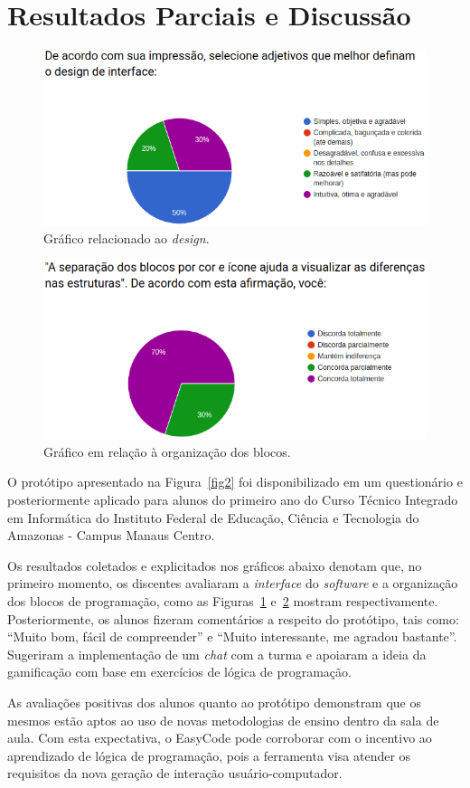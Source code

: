 \documentclass[12pt]{article}
\begin{document}
\section{Resultados Parciais e Discussão}
	\begin{figure}[!htbp]
		\centering
		\includegraphics[scale=0.4]{g1.png}
		\caption{Gráfico relacionado ao \textit{design}.}
		\label{fig3}
	\end{figure}
		\begin{figure}[!htbp]
		\centering
		\includegraphics[scale=0.4]{g2.png}
		\caption{Gráfico em relação à organização dos blocos.}
		\label{fig4}
	\end{figure}

O protótipo apresentado na Figura~\ref{fig2} foi disponibilizado em um questionário e posteriormente aplicado para alunos do primeiro ano do Curso Técnico Integrado em Informática do Instituto Federal de Educação, Ciência e Tecnologia do Amazonas - Campus Manaus Centro.
\par Os resultados coletados e explicitados nos gráficos abaixo denotam que, no primeiro momento, os discentes avaliaram a \textit{interface} do \textit{software} e a organização dos blocos de programação, como as Figuras~\ref{fig3} e~\ref{fig4} mostram respectivamente. Posteriormente, os alunos fizeram comentários a respeito do protótipo, tais como: ``Muito bom, fácil de compreender'' e ``Muito interessante, me agradou bastante''. Sugeriram a implementação de um \textit{chat} com a turma e apoiaram a ideia da gamificação com base em exercícios de lógica de programação. 
\par As avaliações positivas dos alunos quanto ao protótipo demonstram que os mesmos estão aptos ao uso de novas metodologias de ensino dentro da sala de aula. Com esta expectativa, o EasyCode pode corroborar com o incentivo ao aprendizado de lógica de programação, pois a ferramenta visa atender os requisitos da nova geração de interação usuário-computador. 	
\end{document}
